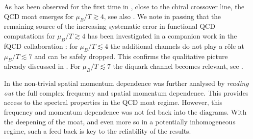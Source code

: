 \documentclass[10pt,prd,superscriptaddress,twocolumn]{revtex4-2}
\begin{document}
As has been observed for the first time in \cite{Fu:2019hdw}, close to the chiral crossover line, the QCD moat emerges for $\mu_B/T\gtrsim 4$, see also \cite{Fu:2024rto}.
We note in passing that the remaining source of the increasing systematic error in functional QCD computations for 
$\mu_B/T\gtrsim 4$ has been investigated in a companion work \cite{WZHWYF2026} in the fQCD collaboration \cite{fQCD}: for $\mu_B/T\lesssim 4$ the additional channels do not play a rôle at $\mu_B/T\lesssim 7$ and can be safely dropped. This confirms the qualitative picture already discussed in \cite{Braun:2019aow}. For $\mu_B/T\lesssim 7$ the diquark channel becomes relevant, see \cite{Braun:2019aow}. 

In \cite{Fu:2024rto} the non-trivial spatial momentum dependence was further analysed by \textit{reading out} the full complex frequency and spatial momentum dependence. This provides access to the spectral properties in the QCD moat regime. However, this frequency and momentum dependence was not fed back into the diagrams. With the deepening of the moat, and even more so in a potentially inhomogeneous regime, such a feed back is key to the reliability of the results. 
\end{document}
